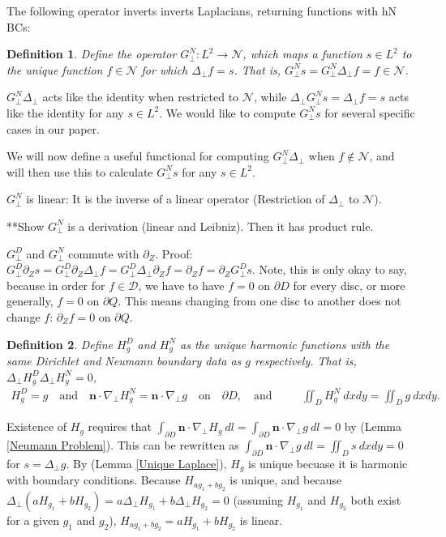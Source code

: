 \documentclass{article}
\newtheorem{definition}{Definition}
\newcommand{\np}{\nabla_\perp}
\newcommand{\lap}{\Delta_\perp}
\newcommand{\p}{\partial}
\newcommand{\GN}{G_\perp^N}
\newcommand{\GD}{G_\perp^D}
\begin{document}
The following operator inverts inverts Laplacians, returning functions with hN BCs: 
\begin{definition}
    Define the operator $\GN:L^2\to\mathcal{N}$, which maps a function $s\in L^2$ to the unique function $f\in\mathcal{N}$ for which $\lap f=s$. That is, $\GN s = \GN\lap f = f\in\mathcal{N}$.
\end{definition}
$\GN\lap$ acts like the identity when restricted to $\mathcal{N}$, while $\lap\GN s = \lap f = s$ acts like the identity for any $s\in L^2$. We would like to compute $\GN s$ for several specific cases in our paper. 

We will now define a useful functional for computing $\GN\lap$ when $f\notin\mathcal{N}$, and will then use this to calculate $\GN s$ for any $s\in L^2$. 

$\GN$ is linear: It is the inverse of a linear operator (Restriction of $\lap$ to $\mathcal{N}$). 

**Show $\GN$ is a derivation (linear and Leibniz). Then it has product rule. 

$\GD$ and $\GN$ commute with $\p_Z$. Proof: $\GD\p_Zs=\GD\p_Z\lap f = \GD\lap\p_Zf = \p_Zf = \p_Z\GD s$. Note, this is only okay to say, because in order for $f\in\mathcal{D}$, we have to have $f=0$ on $\p D$ for every disc, or more generally, $f=0$ on $\p Q$. This means changing from one disc to another does not change $f$: $\p_Zf=0$ on $\p Q$. 

\begin{definition}
    Define $H^D_g$ and $H^N_g$ as the unique harmonic functions with the same Dirichlet and Neumann boundary data as $g$ respectively. That is, $\lap H^D_g \lap H^N_g = 0$,  
    \begin{align}
        H^D_g = g \quad\text{and}\quad \bm{n}\cdot\np H^N_g = \bm{n}\cdot\np g \quad\text{on}\quad \p D, \quad\text{and}\quad &&  \iint_D H^N_g\ dxdy = \iint_D g\ dxdy. 
    \end{align}
\end{definition}
Existence of $H_g$ requires that $\int_{\p D} \bm{n}\cdot\np H_g\ dl = \int_{\p D} \bm{n}\cdot\np g\ dl = 0$ by (Lemma \ref{Neumann Problem}). This can be rewritten as $\int_{\p D} \bm{n}\cdot\np g\ dl = \iint_D s\ dxdy = 0$ for $s=\lap g$. 
By (Lemma \ref{Unique Laplace}), $H_g$ is unique becuase it is harmonic with boundary conditions. 
Because $H_{ag_1+bg_2}$ is unique, and because $\lap(aH_{g_1}+ bH_{g_2}) = a\lap H_{g_1} + b\lap H_{g_2} = 0$ (assuming $H_{g_1}$ and $H_{g_2}$ both exist for a given $g_1$ and $g_2$), $H_{ag_1+bg_2} = aH_{g_1} + bH_{g_2}$ is linear. 
\end{document}

